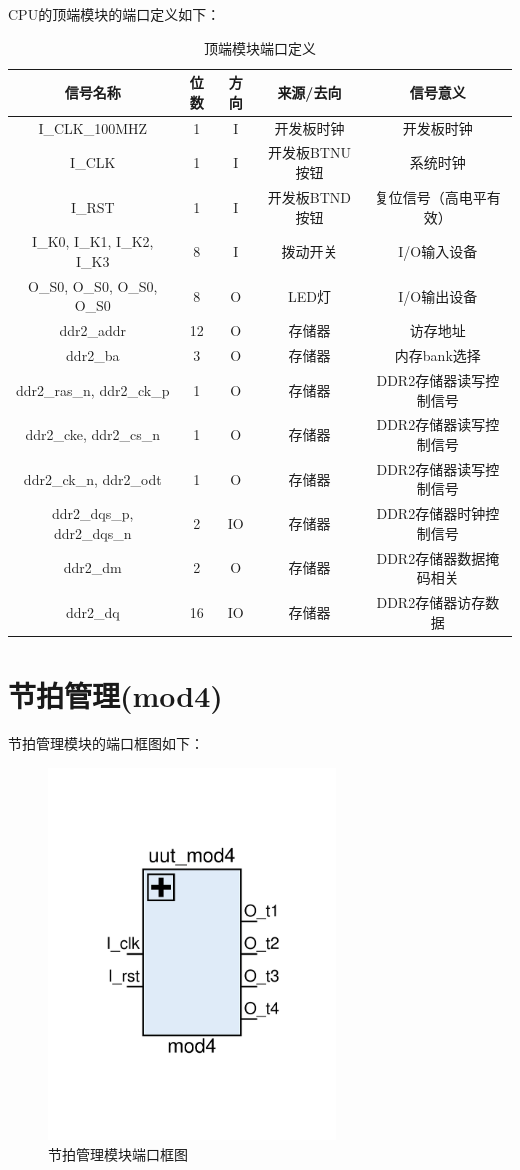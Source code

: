 \documentclass[forprint]{WHUBachelor}
\begin{document}
CPU的顶端模块的端口定义如下：

\begin{table}[ht]
  \centering
  \begin{tabular}{c c c c c}
    \hline
    信号名称 & 位数 & 方向 &来源/去向 & 信号意义 \\
    \hline
    I\_CLK\_100MHZ & 1 & I & 开发板时钟 & 开发板时钟 \\
    I\_CLK & 1 & I & 开发板BTNU按钮 & 系统时钟 \\
    I\_RST & 1 & I & 开发板BTND按钮 & 复位信号（高电平有效） \\
    I\_K0, I\_K1, I\_K2, I\_K3 & 8 & I & 拨动开关 & I/O输入设备 \\
    O\_S0, O\_S0, O\_S0, O\_S0 & 8 & O & LED灯 & I/O输出设备 \\
    ddr2\_addr & 12 & O & 存储器 & 访存地址 \\
    ddr2\_ba & 3 & O & 存储器 & 内存bank选择\\
    ddr2\_ras\_n, ddr2\_ck\_p & 1 & O & 存储器 & DDR2存储器读写控制信号 \\
    ddr2\_cke, ddr2\_cs\_n & 1 & O & 存储器 & DDR2存储器读写控制信号\\
    ddr2\_ck\_n, ddr2\_odt & 1 & O & 存储器 & DDR2存储器读写控制信号\\
    ddr2\_dqs\_p, ddr2\_dqs\_n & 2 & IO & 存储器 & DDR2存储器时钟控制信号\\
    ddr2\_dm & 2 & O & 存储器 & DDR2存储器数据掩码相关 \\
    ddr2\_dq & 16 & IO & 存储器 & DDR2存储器访存数据 \\
    \hline
  \end{tabular}
  \caption{顶端模块端口定义}
  \label{tab:ports:cpu}
\end{table}

\section{节拍管理(mod4)}

节拍管理模块的端口框图如下：

\begin{figure}[H]
  \centering
  \includegraphics[width=3in]{figures/ports/mod4.pdf}
  \caption{节拍管理模块端口框图}
  \label{fig:ports:mod4}
\end{figure}
\end{document}
